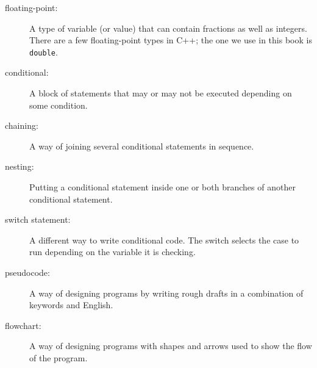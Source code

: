 \begin{description}
\item[floating-point:] A type of variable (or value) that can contain
fractions as well as integers.  There are a few floating-point types
in C++; the one we use in this book is {\tt double}.

\item[conditional:]  A block of statements that may or may not
be executed depending on some condition.

\item[chaining:]  A way of joining several conditional statements
in sequence.

\item[nesting:] Putting a conditional statement inside one or both
branches of another conditional statement.

\item[switch statement:] A different way to write conditional code. The switch selects the case to run depending on the variable it is checking.

\item[pseudocode:]  A way of designing programs by writing
rough drafts in a combination of keywords and English.

\item[flowchart:] A way of designing programs with shapes and arrows used to show the flow of the program. 


\end{description}


